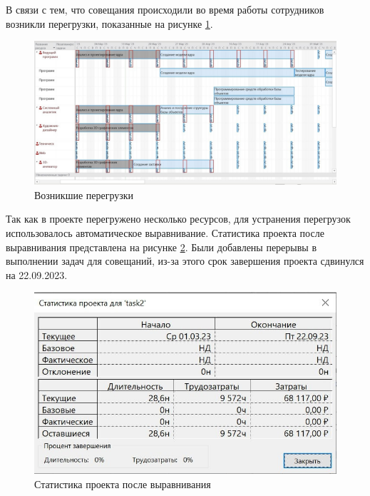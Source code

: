 В связи с тем, что совещания происходили во время работы сотрудников возникли перегрузки, показанные на рисунке \ref{img:task2-meeting-overload}. 

\begin{figure}[H]
	\begin{center}
		\includegraphics[scale=0.3]{inc/img/task2-meeting-overload.jpg}
	\end{center}
	\captionsetup{justification=centering}
	\caption{Возникшие перегрузки}
	\label{img:task2-meeting-overload}
\end{figure}

Так как в проекте перегружено несколько ресурсов, для устранения перегрузок использовалось автоматическое выравнивание. Статистика проекта после выравнивания представлена на рисунке \ref{img:task2-alignment}. Были добавлены перерывы в выполнении задач для совещаний, из-за этого срок завершения проекта сдвинулся на 22.09.2023.

\begin{figure}[H]
	\begin{center}
		\includegraphics[scale=0.3]{inc/img/task2-alignment.jpg}
	\end{center}
	\captionsetup{justification=centering}
	\caption{Статистика проекта после выравнивания}
	\label{img:task2-alignment}
\end{figure}

